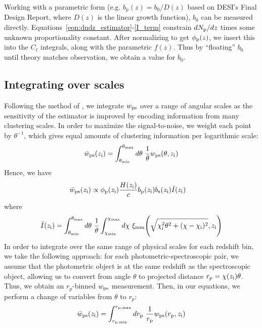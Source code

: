 Working with a parametric form (e.g. $b_p(z) = b_0 / D(z)$ based on DESI's Final Design Report, where $D(z)$ is the linear growth function), $b_0$ can be measured directly. Equations~\ref{eqn:dndz_estimator}-\ref{I_term} constrain $dN_{\rm p}/dz$ times some unknown proportionality constant. After normalizing to get $\phi_{\rm p}(z)$, we insert this into the $C_{\ell}$ integrals, along with the parametric $f(z)$. Thus by ``floating'' $b_0$ until theory matches observation, we obtain a value for $b_0$.

\subsection{Integrating over scales}

Following the method of \citealt{Menard13}, we integrate $w_{\rm ps}$ over a range of angular scales as the sensitivity of the estimator is improved by encoding information from many clustering scales. In order to maximize the signal-to-noise, we weight each point by $\theta^{-1}$, which gives equal amounts of clustering information per logarithmic scale: 
\begin{align}
    \bar{w}_{\rm ps}(z_{\rm i}) = \int_{\theta_{\rm min}}^{\theta_{\rm max}}d\theta \ \frac{1}{\theta} w_{\rm ps}(\theta, z_{\rm i})
\end{align}
%
Hence, we have
\begin{align}
    \bar{w}_{\rm ps}(z_{\rm i}) &\propto \phi_{\rm p}(z_{\rm i})\frac{H(z_{\rm i})}{c}b_{\rm p}(z_{\rm i})b_{\rm s}(z_{\rm i})\bar{I}(z_{\rm i})
\end{align}
where
\begin{equation}\label{Ibar}
    \bar{I}(z_{\rm i}) = \int_{\theta_{\rm min}}^{\theta_{\rm max}}d\theta \ \frac{1}{\theta} \int_{\chi_{\rm min}}^{\chi_{\rm max}}d\chi \ \xi_{\rm mm}{\Bigg (}\sqrt{\chi_{\rm i}^2\theta^2 + (\chi-\chi_{\rm i})^2},z_{\rm i}{\Bigg )}
\end{equation}
In order to integrate over the same range of physical scales for each redshift bin, we take the following approach: for each photometric-spectroscopic pair, we assume that the photometric object is at the same redshift as the spectroscopic object, allowing us to convert from angle $\theta$ to projected distance $r_p = \chi(z_{\rm i})\theta$. Thus, we obtain an $r_p$-binned $w_{\rm ps}$ measurement. Then, in our equations, we perform a change of variables from $\theta$ to $r_p$:
\begin{align}
    \bar{w}_{\rm ps}(z_{\rm i}) = \int_{r_{\rm p, min}}^{r_{\rm p, max}}dr_{\rm p} \ \frac{1}{r_{\rm p}} w_{\rm ps}(r_{\rm p}, z_{\rm i})
\end{align}
